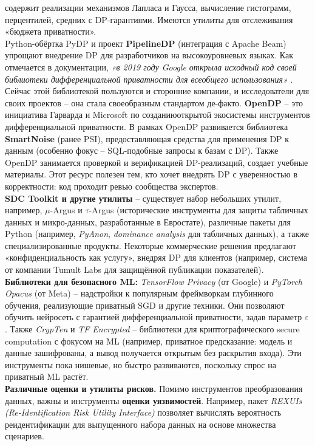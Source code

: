 содержит реализации механизмов Лапласа и Гаусса, вычисление гистограмм, перцентилей, средних с DP-гарантиями. Имеются
утилиты для отслеживания «бюджета приватности».\\
Python-обёртка PyDP и проект \textbf{PipelineDP} (интеграция с Apache Beam) упрощают внедрение DP для разработчиков на высокоуровневых языках. Как отмечается в документации, \textit{«в 2019 году Google открыла исходный код своей библиотеки дифференциальной приватности для всеобщего использования»}
\autocite{pydp-readthedocs-io}. Сейчас этой библиотекой пользуются и сторонние компании, и исследователи для своих
проектов – она стала своеобразным стандартом де-факто.
\textbf{OpenDP} – это инициатива Гарварда и Microsoft по созданиюоткрытой экосистемы инструментов дифференциальной приватности. В рамках OpenDP развивается библиотека \textbf{SmartNoise} (ранее PSI), предоставляющая средства для применения DP к данным (особенно фокус – SQL-подобные запросы к базам с DP). Также OpenDP занимается проверкой и верификацией DP-реализаций, создает учебные материалы. Этот
ресурс полезен тем, кто хочет внедрять DP с уверенностью в корректности: код проходит ревью сообщества экспертов.\\
\textbf{SDC Toolkit и другие утилиты} – существует набор небольших утилит, например, $\mu$-Argus и $\tau$-Argus
(исторические инструменты для защиты табличных данных и микро-данных, разработанные в Евростате), различные пакеты для
Python (например, \textit{PyAnon}, \textit{dominance analysis} для табличных данных), а также специализированные
продукты. Некоторые коммерческие решения предлагают «конфиденциальность как услугу», внедряя DP для клиентов (например,
система от компании Tumult Labs для защищённой публикации показателей).\\
\textbf{Библиотеки для безопасного ML:}
\textit{TensorFlow Privacy} (от Google) и \textit{PyTorch Opacus} (от Meta) – надстройки к популярным фреймворкам
глубинного обучения, реализующие приватный SGD и другие техники. Они позволяют обучить нейросеть с гарантией
дифференциальной приватности, задав параметр $\varepsilon$. Также \textit{CrypTen} и \textit{TF Encrypted} – библиотеки
для криптографического secure computation с фокусом на ML (например, приватное предсказание: модель и данные
зашифрованы, а вывод получается открытым без раскрытия входа). Эти инструменты пока нишевые, но быстро развиваются,
поскольку спрос на приватный ML растёт.\\
\textbf{Различные оценки и утилиты рисков.}
Помимо инструментов преобразования данных, важны и инструменты \textbf{оценки уязвимостей}. Например, пакет \textit{REXUIs (Re-Identification Risk Utility Interface)} позволяет вычислять вероятность реидентификации для выпущенного набора данных на основе множества сценариев.\\
